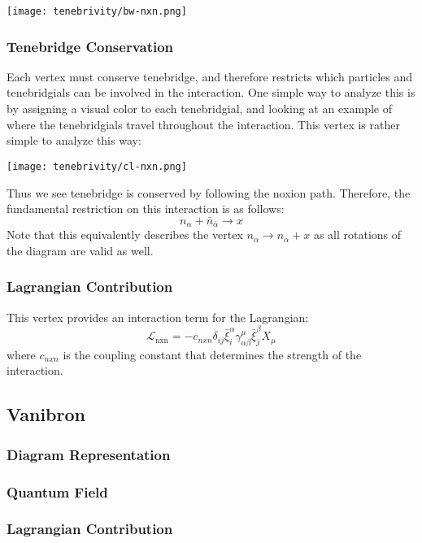 \hfill\texttt{[image: tenebrivity/bw-nxn.png]}\hspace*{\fill}

\subsubsection{Tenebridge Conservation}

Each vertex must conserve tenebridge, and therefore restricts which particles
and tenebridgials can be involved in the interaction. One simple way to analyze
this is by assigning a visual color to each tenebridgial, and looking at an
example of where the tenebridgials travel throughout the interaction. This
vertex is rather simple to analyze this way:

\hfill\texttt{[image: tenebrivity/cl-nxn.png]}\hspace*{\fill}

Thus we see tenebridge is conserved by following the noxion path. Therefore,
the fundamental restriction on this interaction is as follows:
\[
  n_{\alpha} + \bar{n}_{\bar{\alpha}} \rightarrow x
\]
Note that this equivalently describes the vertex \(n_{\alpha} \rightarrow
n_{\alpha} + x \) as all rotations of the diagram are valid as well.

\subsubsection{Lagrangian Contribution}
This vertex provides an interaction term for the Lagrangian:
\[
  \mathcal{L}_{\text{nxn}} = -c_{nxn} \delta_{ij} \bar{\xi}^{\alpha}_{i} \gamma^{\mu}_{\alpha \beta} \bar{\xi}^{\beta}_{j} X_{\mu}
\]
where \(c_{nxn}\) is the coupling constant that determines the strength of the
interaction.

\subsection{Vanibron}
\subsubsection{Diagram Representation}
\subsubsection{Quantum Field}
\subsubsection{Lagrangian Contribution}

